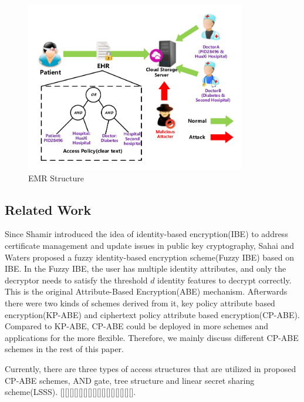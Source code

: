 \documentclass[smallextended]{svjour3}       %
\begin{document}
	\begin{figure}\label{EMR1}
		\centering
		\includegraphics[width=3.8in, keepaspectratio]{EMR1.pdf}
		\caption{EMR Structure}
	\end{figure}
 
\subsection{Related Work}
	Since Shamir introduced the idea of identity-based encryption(IBE) to address certificate management and update issues in public key cryptography, Sahai and Waters proposed a fuzzy identity-based encryption scheme(Fuzzy IBE) based on IBE. 
	In the Fuzzy IBE, the user has multiple identity attributes, and only the decryptor needs to satisfy the threshold $d$ identity features to decrypt correctly. 
	This is the original Attribute-Based Encryption(ABE) mechanism. 
	Afterwards there were two kinds of schemes derived from it, key policy attribute based encryption(KP-ABE) and ciphertext policy attribute based encryption(CP-ABE). 
	Compared to KP-ABE, CP-ABE could be deployed in more schemes and applications for the more flexible. 
	Therefore, we mainly discuss different CP-ABE schemes in the rest of this paper.

	Currently, there are three types of access structures that are utilized in proposed CP-ABE schemes, AND gate, tree structure and linear secret sharing scheme(LSSS).
	[][][][][][][][][][][][][][][][].
\end{document}
